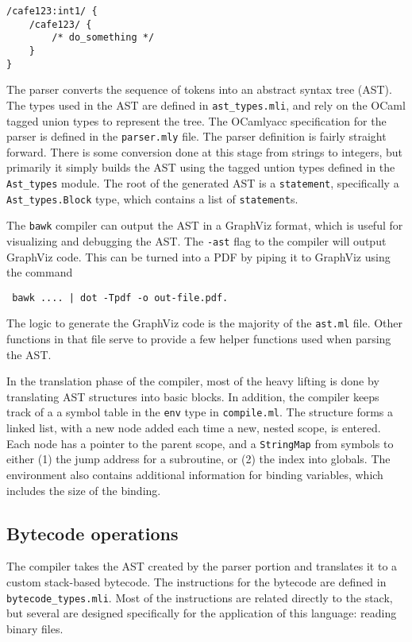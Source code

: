 \begin{lstlisting}[caption=Possibly ambiguous code]
/cafe123:int1/ {
	/cafe123/ {
		/* do_something */
	}
}
\end{lstlisting}

The parser converts the sequence of tokens into an abstract syntax tree (AST).  The types used in the AST are defined in \texttt{ast\_types.mli}, and rely on the OCaml tagged union types to represent the tree.  The OCamlyacc specification for the parser is defined in the \texttt{parser.mly} file.  The parser definition is fairly straight forward.  There is some conversion done at this stage from strings to integers, but primarily it simply builds the AST using the tagged untion types defined in the \texttt{Ast\_types} module.  The root of the generated AST is a \texttt{statement}, specifically a \texttt{Ast\_types.Block} type, which contains a list of \texttt{statement}s.

The \texttt{bawk} compiler can output the AST in a GraphViz format, which is useful for visualizing and debugging the AST.  The \texttt{-ast} flag to the compiler will output GraphViz code.  This can be turned into a PDF by piping it to GraphViz using the command
\begin{center}\tt
bawk .... | dot -Tpdf -o out-file.pdf\rm.
\end{center}
The logic to generate the GraphViz code is the majority of the \texttt{ast.ml} file.  Other functions in that file serve to provide a few helper functions used when parsing the AST.

\bigskip
In the translation phase of the compiler, most of the heavy lifting is done by translating AST structures into basic blocks.  In addition, the compiler keeps track of a a symbol table in the \texttt{env} type in \texttt{compile.ml}.  The structure forms a linked list, with a new node added each time a new, nested scope, is entered.  Each node has a pointer to the parent scope, and a \texttt{StringMap} from symbols to either (1) the jump address for a subroutine, or (2) the index into globals.  The environment also contains additional information for binding variables, which includes the size of the binding.

\subsection{Bytecode operations}
The compiler takes the AST created by the parser portion and translates it to a custom stack-based bytecode.  The instructions for the bytecode are defined in \texttt{bytecode\_types.mli}.  Most of the instructions are related directly to the stack, but several are designed specifically for the application of this language: reading binary files.

